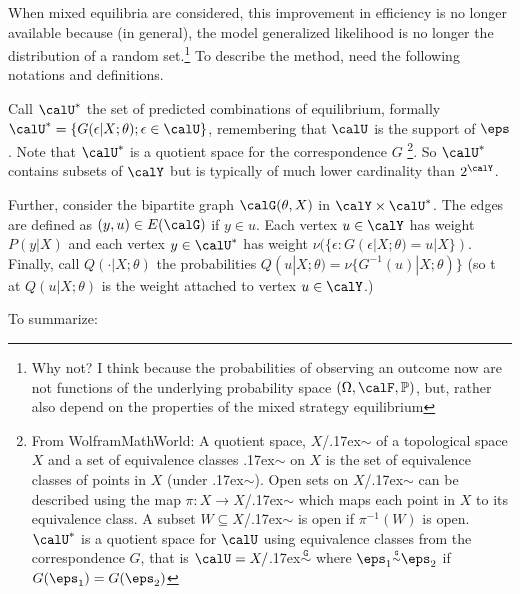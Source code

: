 When mixed equilibria are considered, this improvement in efficiency is no longer available because (in general), the model generalized likelihood is no longer the distribution of a random set.\footnote{Why not? I think because the probabilities of observing an outcome now are not functions of the underlying probability space $(\Omega, \calF, \mathbb{P})$, but, rather also depend on the properties of the mixed strategy equilibrium} To describe the method, need the following notations and definitions.

Call $\calU^*$ the set of predicted combinations of equilibrium, formally $\calU^* = \{G(\epsilon|X;\theta); \epsilon \in \calU\}$, remembering that $\calU$ is the support of $\eps$. Note that $\calU^*$ is a quotient space for the correspondence $G$
\footnote{From WolframMathWorld: A quotient space, $X$/{\raise.17ex\hbox{$\scriptstyle\mathtt{\sim}$}} of a topological space $X$ and a set of equivalence classes {\raise.17ex\hbox{$\scriptstyle\mathtt{\sim}$}} on $X$ is the set of equivalence classes of points in $X$ (under {\raise.17ex\hbox{$\scriptstyle\mathtt{\sim}$}}). Open sets on $X$/{\raise.17ex\hbox{$\scriptstyle\mathtt{\sim}$}} can be described using the map $\pi: X\rightarrow X$/{\raise.17ex\hbox{$\scriptstyle\mathtt{\sim}$}} which maps each point in $X$ to its equivalence class. A subset $W \subseteq X$/{\raise.17ex\hbox{$\scriptstyle\mathtt{\sim}$}} is open if $\pi^{-1}(W)$ is open. $\calU^*$ is a quotient space for $\calU$ using equivalence classes from the correspondence $G$, that is $\calU = X/${\raise.17ex\hbox{$\scriptstyle\mathtt{\overset{G}\sim}$}} where $\eps_1{\raise.17ex\hbox{$\scriptstyle\mathtt{\overset{G}\sim}$}} \eps_2$ if $G(\eps_1) = G(\eps_2)$}.
So $\calU^*$ contains subsets of $\calY$ but is typically of much lower cardinality than $2^\calY$.

Further, consider the bipartite graph $\calG(\theta, X)$ in $\calY \times \calU^*$. The edges are defined as $(y,u) \in E(\calG)$ if $y \in u$. Each vertex $u \in \calY$ has weight $P(y|X)$ and each vertex $y\in \calU^*$ has weight $\nu(\{\epsilon: G(\epsilon|X;\theta) = u|X\})$. Finally, call $Q(\cdot|X;\theta)$ the probabilities $Q(u|X;\theta) = \nu\{G^{-1}(u)| X;\theta)\}$ (so t at $Q(u|X;\theta)$ is the weight attached to vertex $u \in \calY$.)

To summarize:


